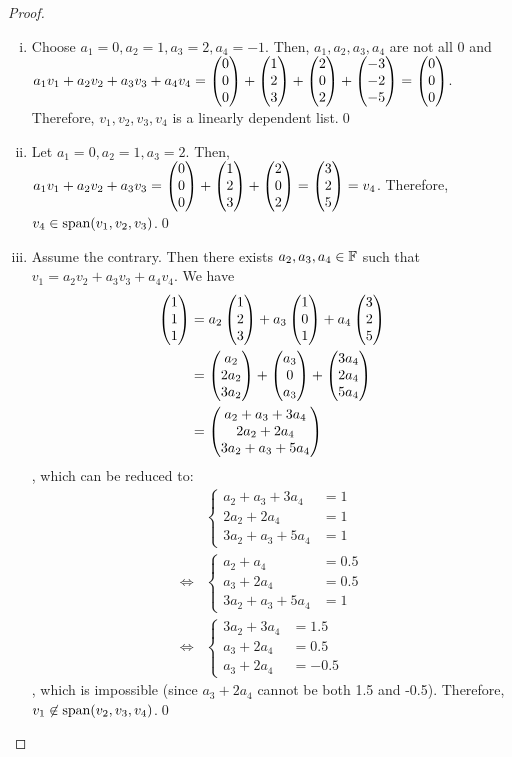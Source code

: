 \begin{proof}
    \renewcommand{\qedsymbol}{$ $}
    \begin{enumerate}[(i)]
        \renewcommand{\qedsymbol}{$\blacksquare$}
        \item Choose $a_1=0, a_2=1, a_3=2, a_4=-1$. Then, $a_1,a_2,a_3,a_4$ are not all 0 and $a_1v_1+a_2v_2+a_3v_3+a_4v_4=\begin{pmatrix} 0\\ 0\\ 0\end{pmatrix}+\begin{pmatrix} 1\\ 2\\ 3\end{pmatrix}+\begin{pmatrix} 2\\ 0\\ 2\end{pmatrix}+\begin{pmatrix} -3\\ -2\\ -5\end{pmatrix}=\begin{pmatrix} 0\\ 0\\ 0\end{pmatrix}$. Therefore, $v_1,v_2,v_3,v_4$ is a linearly dependent list.\qed
        \item Let $a_1=0, a_2=1, a_3=2$. Then, $a_1v_1+a_2v_2+a_3v_3=\begin{pmatrix} 0\\ 0\\ 0\end{pmatrix}+\begin{pmatrix} 1\\ 2\\ 3\end{pmatrix}+\begin{pmatrix} 2\\ 0\\ 2\end{pmatrix}=\begin{pmatrix} 3\\ 2\\ 5\end{pmatrix}=v_4$. Therefore, $v_4\in\textnormal{span}(v_1,v_2,v_3)$.\qed
        \item Assume the contrary. Then there exists $a_2,a_3,a_4\in\mathbb F$ such that $v_1=a_2v_2+a_3v_3+a_4v_4$. We have
              \[
                  \begin{aligned}
                      \begin{pmatrix} 1\\ 1\\ 1\end{pmatrix} & = a_2 \begin{pmatrix} 1\\ 2\\ 3\end{pmatrix}+a_3 \begin{pmatrix} 1\\ 0\\ 1\end{pmatrix}+a_4 \begin{pmatrix} 3\\ 2\\ 5\end{pmatrix}          \\
                                            & = \begin{pmatrix} a_2\\ 2a_2\\ 3a_2\end{pmatrix}+\begin{pmatrix} a_3\\ 0\\ a_3\end{pmatrix}+\begin{pmatrix} 3a_4\\ 2a_4\\ 5a_4\end{pmatrix} \\
                                            & = \begin{pmatrix} a_2+a_3+3a_4\\ 2a_2+2a_4\\ 3a_2+a_3+5a_4\end{pmatrix}
                  \end{aligned}
              \]
              , which can be reduced to:
              \begin{align*}
                   & \begin{cases}
                         a_2+a_3+3a_4  & = 1 \\
                         2a_2+2a_4     & = 1 \\
                         3a_2+a_3+5a_4 & = 1
                     \end{cases}   \\
                  \iff
                   & \begin{cases}
                         a_2+a_4       & = 0.5 \\
                         a_3+2a_4      & = 0.5 \\
                         3a_2+a_3+5a_4 & = 1
                     \end{cases} \\
                  \iff
                   & \begin{cases}
                         3a_2+3a_4 & = 1.5  \\
                         a_3+2a_4  & = 0.5  \\
                         a_3+2a_4  & = -0.5
                     \end{cases}
              \end{align*}
              , which is impossible (since $a_3+2a_4$ cannot be both 1.5 and -0.5). Therefore, $v_1\not\in\textnormal{span}{(v_2,v_3,v_4)}$.\qed
    \end{enumerate}
\end{proof}